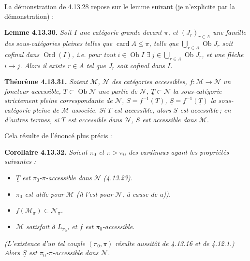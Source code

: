 \documentclass[11pt]{article}
\newcommand{\printedpage}[1]{\marginpar{\footnotesize p.~#1}}
\newcommand{\msp}[1]{\marginpar{\footnotesize [#1]}}
\newcommand{\Ob}{\operatorname{Ob}}
\newcommand{\Ord}{\operatorname{Ord}}
\newcommand{\card}{\operatorname{card}}
\begin{document}
La démonstration de 4.13.28 repose sur le lemme suivant (je n'explicite par la démonstration) : %

\printedpage{133}
\msp{page 350}
\textbf{Lemme 4.13.30.} \textit{Soit $I$ une catégorie grande devant $\pi$, et $(J_r)_{r\in A}$ une famille des sous-catégories pleines telles que $\card A\leqslant\pi$, telle que $\bigcup_{r\in A}\Ob J_r$ soit cofinal dans $\Ord(I)$, i.e. pour tout $i\in\Ob I$ $\exists\ j\in\bigcup_{r\in A}\Ob J_r$, et une flèche $i\longrightarrow j$. Alors il existe $r\in A$ tel que $J_r$ soit cofinal dans $I$.}

\textbf{Théorème 4.13.31.} \textit{Soient $\mathcal{M}$, $\mathcal{N}$ des catégories accessibles, $f:\mathcal{M}\longrightarrow\mathcal{N}$ un foncteur accessible, $T\subset\Ob\mathcal{N}$ une partie de $\mathcal{N}$, $\underline{T}\subset\mathcal{N}$ la sous-catégorie strictement pleine correspondante de $\mathcal{N}$, $S=f^{-1}(T)$, $\underline{S}=f^{-1}(\underline{T})$ la sous-catégorie pleine de $\mathcal{M}$ associée. Si $T$ est accessible, alors $S$ est accessible\,; en d'autres termes, si $\underline{T}$ est accessible dans $\mathcal{N}$, $\underline{S}$ est accessible dans $\mathcal{M}$.}

Cela résulte de l'énoncé plus précis :

\textbf{Corollaire 4.13.32.} \textit{Soient $\pi_0$ et $\pi>\pi_0$ des cardinaux ayant les propriétés suivantes :}

\msp{page 351}
\begin{itemize}[leftmargin=2.5em]
\item[\textit{a)}] \textit{$\underline{T}$ est $\pi_0$-$\pi$-accessible dans $\mathcal{N}$ (4.13.23).}
\item[\textit{b)}] \textit{$\pi_0$ est utile pour $\mathcal{M}$ (il l'est pour $\mathcal{N}$, à cause de a)).}
\item[\textit{c)}] \textit{$f(\mathcal{M}_\pi)\subset\mathcal{N}_\pi$.}
\item[\textit{d)}] \textit{$\mathcal{M}$ satisfait à $L_{\pi_0}$, et $f$ est $\pi_0$-accessible.}
\end{itemize}
\textit{(L'existence d'un tel couple $(\pi_0,\pi)$ résulte aussitôt de 4.13.16 et de 4.12.1.) Alors $\underline{S}$ est $\pi_0$-$\pi$-accessible dans $\mathcal{N}$.}
\end{document}
